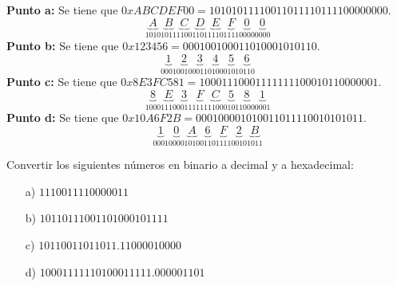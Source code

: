 \begin{solution}
    \textbf{Punto a:} Se tiene que $0xABCDEF00 = 10101011110011011110111100000000$.
    \begin{equation*}
        \underbrace{A}_{1010} \underbrace{B}_{1011} \underbrace{C}_{1100} \underbrace{D}_{1101} \underbrace{E}_{1110} \underbrace{F}_{1111} \underbrace{0}_{0000} \underbrace{0}_{0000}
    \end{equation*}
    \textbf{Punto b:} Se tiene que $0x123456 = 000100100011010001010110$.
    \begin{equation*}
        \underbrace{1}_{0001} \underbrace{2}_{0010} \underbrace{3}_{0011} \underbrace{4}_{0100} \underbrace{5}_{0101} \underbrace{6}_{0110}
    \end{equation*}
    \textbf{Punto c:} Se tiene que $0x8E3FC581 = 10001110001111111100010110000001$.
    \begin{equation*}
        \underbrace{8}_{1000} \underbrace{E}_{1110} \underbrace{3}_{0011} \underbrace{F}_{1111} \underbrace{C}_{1100} \underbrace{5}_{0101} \underbrace{8}_{1000} \underbrace{1}_{0001}
    \end{equation*}
    \textbf{Punto d:} Se tiene que $0x10A6F2B = 000100001010011011110010101011$.
    \begin{equation*}
        \underbrace{1}_{0001} \underbrace{0}_{0000} \underbrace{A}_{1010} \underbrace{6}_{0110} \underbrace{F}_{1111} \underbrace{2}_{0010} \underbrace{B}_{1011}
    \end{equation*}
\end{solution}

\begin{ejer}
    Convertir los siguientes números en binario a decimal y a hexadecimal:
    \begin{itemize}
        \item[a)] $1110011110000011$
        \item[b)] $10110111001101000101111$
        \item[c)] $10110011011011.11000010000$
        \item[d)] $10001111110100011111.000001101$
    \end{itemize}
\end{ejer}

